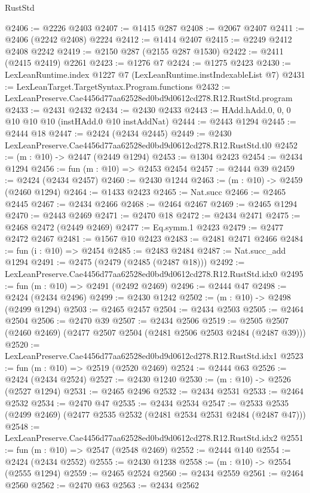 \begin{lexlean}{RustStd}
\begin{coremodule}
@2406 := @2226 @2403
@2407 := @1415 @287
@2408 := @2067 @2407
@2411 := @2406 (@2242 @2408) @2224
@2412 := @1414 @2407
@2415 := @2249 @2412 @2408 @2242
@2419 := @2150 @287 (@2155 @287 @1530)
@2422 := @2411 (@2415 @2419) @2261
@2423 := @1276 @7
@2424 := @1275 @2423
@2430 := LexLeanRuntime.index @1227 @7 (LexLeanRuntime.instIndexableList @7)
@2431 := LexLeanTarget.TargetSyntax.Program.functions
@2432 := LexLeanPreserve.Cae4456d77aa62528ed0bd9d0612cd278.R12.RustStd.program
@2433 := @2431 @2432
@2434 := @2430 @2433
@2443 := HAdd.hAdd.{0, 0, 0} @10 @10 @10 (instHAdd.{0} @10 instAddNat)
@2444 := @2443 @1294
@2445 := @2444 @18
@2447 := @2424 (@2434 @2445)
@2449 := @2430 LexLeanPreserve.Cae4456d77aa62528ed0bd9d0612cd278.R12.RustStd.tl0
@2452 := (m : @10) -> @2447 (@2449 @1294)
@2453 := @1304 @2423
@2454 := @2434 @1294
@2456 := fun (m : @10) => @2453 @2454
@2457 := @2444 @39
@2459 := @2424 (@2434 @2457)
@2460 := @2430 @1244
@2463 := (m : @10) -> @2459 (@2460 @1294)
@2464 := @1433 @2423
@2465 := Nat.succ
@2466 := @2465 @2445
@2467 := @2434 @2466
@2468 := @2464 @2467
@2469 := @2465 @1294
@2470 := @2443 @2469
@2471 := @2470 @18
@2472 := @2434 @2471
@2475 := @2468 @2472 (@2449 @2469)
@2477 := Eq.symm.{1} @2423
@2479 := @2477 @2472 @2467
@2481 := @1567 @10 @2423
@2483 := @2481 @2471 @2466
@2484 := fun (i : @10) => @2454
@2485 := @2483 @2484
@2487 := Nat.succ_add @1294
@2491 := @2475 (@2479 (@2485 (@2487 @18)))
@2492 := LexLeanPreserve.Cae4456d77aa62528ed0bd9d0612cd278.R12.RustStd.idx0
@2495 := fun (m : @10) => @2491 (@2492 @2469)
@2496 := @2444 @47
@2498 := @2424 (@2434 @2496)
@2499 := @2430 @1242
@2502 := (m : @10) -> @2498 (@2499 @1294)
@2503 := @2465 @2457
@2504 := @2434 @2503
@2505 := @2464 @2504
@2506 := @2470 @39
@2507 := @2434 @2506
@2519 := @2505 @2507 (@2460 @2469) (@2477 @2507 @2504 (@2481 @2506 @2503 @2484 (@2487 @39)))
@2520 := LexLeanPreserve.Cae4456d77aa62528ed0bd9d0612cd278.R12.RustStd.idx1
@2523 := fun (m : @10) => @2519 (@2520 @2469)
@2524 := @2444 @63
@2526 := @2424 (@2434 @2524)
@2527 := @2430 @1240
@2530 := (m : @10) -> @2526 (@2527 @1294)
@2531 := @2465 @2496
@2532 := @2434 @2531
@2533 := @2464 @2532
@2534 := @2470 @47
@2535 := @2434 @2534
@2547 := @2533 @2535 (@2499 @2469) (@2477 @2535 @2532 (@2481 @2534 @2531 @2484 (@2487 @47)))
@2548 := LexLeanPreserve.Cae4456d77aa62528ed0bd9d0612cd278.R12.RustStd.idx2
@2551 := fun (m : @10) => @2547 (@2548 @2469)
@2552 := @2444 @140
@2554 := @2424 (@2434 @2552)
@2555 := @2430 @1238
@2558 := (m : @10) -> @2554 (@2555 @1294)
@2559 := @2465 @2524
@2560 := @2434 @2559
@2561 := @2464 @2560
@2562 := @2470 @63
@2563 := @2434 @2562

\end{coremodule}
\end{lexlean}
